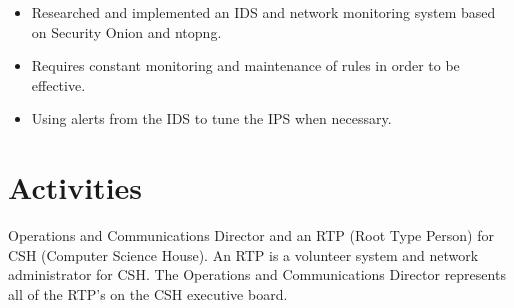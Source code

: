 \documentclass[]{deedy-resume-openfont}
\begin{document}
\begin{minipage}[t]{0.66\textwidth}
\vspace{-3mm}
\begin{itemize}
  \itemsep-4pt
  \item Researched and implemented an IDS and network monitoring system based on Security Onion and ntopng.
  \item Requires constant monitoring and maintenance of rules in order to be effective.
  \item Using alerts from the IDS to tune the IPS when necessary.
\end{itemize}
\vspace{-4mm}
\sectionsep

\vspace{-2mm}
\section{Activities}
Operations and Communications Director and an RTP (Root Type Person) for CSH (Computer Science House). An RTP is a volunteer system and network administrator for CSH. The Operations and Communications Director represents all of the RTP's on the CSH executive board. \\
\sectionsep

\end{minipage} 
\end{document}
